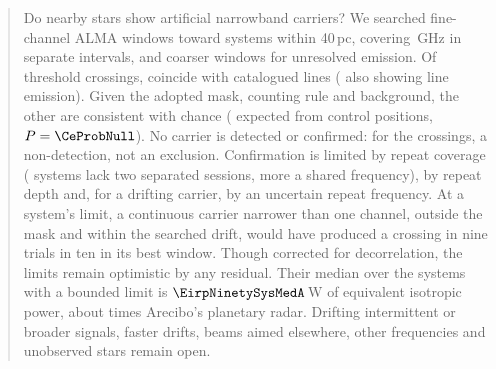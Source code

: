 \begin{abstract}
Do nearby stars show artificial narrowband carriers? We searched \NWinA{}
fine-channel ALMA windows toward \NSysClassA{} systems within 40\,pc, covering
\CvUnionA\,GHz in \CovNIslands{} separate intervals, and \NWinB{} coarser windows
for unresolved emission. Of \CsNCross{} threshold crossings, \MkNCoinc{}
coincide with catalogued lines (\LnAttrSupp{} also showing line emission).
Given the adopted mask, counting rule and background, the other \CeObs{} are consistent with
chance (\CeExp{} expected from control positions, $P=\CeProbNull$). No carrier
is detected or confirmed: for the crossings, a non-detection, not an exclusion.
Confirmation is limited by repeat coverage (\ZcNoRepNoSep{} systems lack two
separated sessions, \ZcNoRepNoFreqWord{} more a shared frequency), by repeat depth
and, for a drifting carrier, by an uncertain repeat frequency. At a system's
limit, a continuous carrier narrower than one channel, outside the mask and
within the searched drift, would have produced a crossing in nine trials in ten
in its best window. Though corrected for decorrelation, the
limits remain optimistic by any residual. Their median over the \NSysALimSum{}
systems with a bounded limit is $\EirpNinetySysMedA$\,W of equivalent isotropic
power, about \AroMedMult{} times Arecibo's planetary radar. Drifting intermittent
or broader signals, faster drifts, beams aimed elsewhere, other frequencies and
unobserved stars remain open.
\end{abstract}



